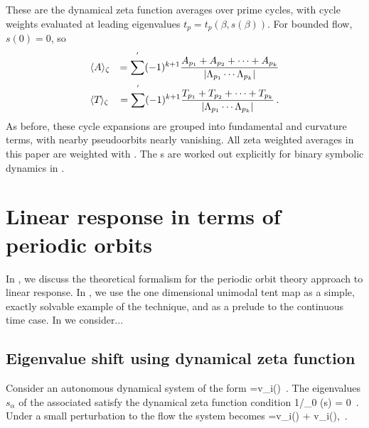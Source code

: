 \documentclass[aps,pre,
                showpacs,
                twocolumn,
                groupedaddress,
                superscriptaddress,
                floatfix]{revtex4-1}
\begin{document}
These are the dynamical zeta function averages over prime cycles, with
cycle weights evaluated at leading eigenvalues $t_{p} =
t_{p}(\beta,s(\beta))$. For bounded flow, $s(0)=0$, so
\begin{eqnarray*}
&\langle {\ensuremath{A}} \rangle_{\zeta}& = \sum^{'}(-1)^{k+1}\frac{A_{p_{1}}+A_{p_{2}}+\cdots+A_{p_{k}}}{\vert \Lambda_{p_{1}}\cdots\Lambda_{p_{k}}\vert}\\
&\langle {{\ensuremath{T_{}}}} \rangle_{\zeta}& = \sum^{'}(-1)^{k+1}\frac{T_{p_{1}}+T_{p_{2}}+\cdots+T_{p_{k}}}{\vert \Lambda_{p_{1}}\cdots\Lambda_{p_{k}}\vert}
\,.
\end{eqnarray*}
As before, these cycle expansions are grouped into fundamental and
curvature terms, with nearby pseudoorbits nearly vanishing. All zeta
weighted averages in this paper are weighted with . The
{\cycForm s} are worked out explicitly for binary symbolic
dynamics in .

\section{Linear response in terms of periodic orbits}
\label{sect:LinRespPO}

In , we discuss the theoretical formalism for the
periodic orbit theory approach to linear response. In
, we use the one dimensional unimodal tent map as
a simple, exactly solvable example of the technique, and as a prelude to
the continuous time case. In  we consider...

\subsection{Eigenvalue shift using dynamical zeta function}
\label{sect:EigeShiftZeta}

Consider an autonomous dynamical system of the form
\beq
{}=v_{i}(\ssp)
\,.
The eigenvalues $s_{\alpha}$ of the associated {\evOper} satisfy
the dynamical zeta function condition
\beq
{1}/{\zeta_{0} (s)} = 0
\,.
Under a small perturbation to the flow
the system becomes
\beq
{}=v_{i}(\ssp) + \epsilon \delta v_{i}(\ssp), \vert\epsilon\vert {}
\,.
\label{pertflow}
\eeq
\end{document}
